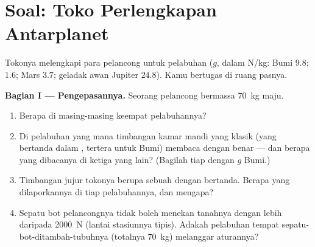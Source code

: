 \section{Soal: Toko Perlengkapan Antarplanet}

\begin{problem}\label{pb:g9:weight-vs-mass:1}
Tokonya melengkapi para pelancong untuk pelabuhan 
($g$, dalam \unit{N/kg}: Bumi $9.8$;  $1.6$; Mars $3.7$;
geladak awan Jupiter $24.8$). Kamu bertugas di ruang pasnya.

\medskip\noindent\textbf{Bagian I --- Pengepasannya.}
Seorang pelancong bermassa \qty{70}{kg} maju.
\begin{enumerate}
  \item Berapa  di masing-masing keempat pelabuhannya?
  \item Di pelabuhan yang mana timbangan kamar mandi yang klasik
        (yang bertanda dalam , tertera untuk Bumi) membaca
         dengan benar --- dan berapa yang dibacanya di ketiga
        yang lain? (Bagilah tiap  dengan $g$ Bumi.)
  \item Timbangan jujur tokonya berupa sebuah  dengan 
        bertanda. Berapa yang dilaporkannya di tiap pelabuhannya, dan
        mengapa?
  \item Sepatu bot pelancongnya tidak boleh menekan tanahnya dengan
        lebih daripada \qty{2000}{N} (lantai stasiunnya tipis). Adakah
        pelabuhan tempat sepatu-bot-ditambah-tubuhnya (totalnya
        \qty{70}{kg}) melanggar aturannya?
\end{enumerate}


\end{problem}
